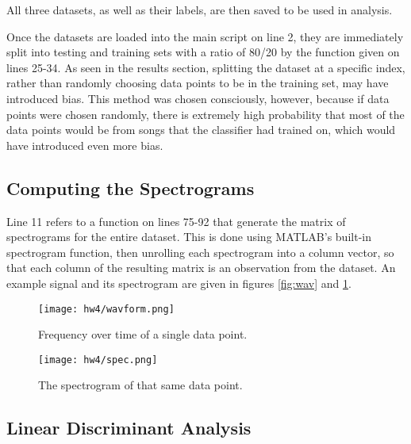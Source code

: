 \documentclass[a4paper,10 pt]{article}
\begin{document}
All three datasets, as well as their labels, are then saved to be used in analysis.

Once the datasets are loaded into the main script on line 2, they are immediately split into testing and training sets with a ratio of 80/20 by the function given on lines 25-34. As seen in the results section, splitting the dataset at a specific index, rather than randomly choosing data points to be in the training set, may have introduced bias. This method was chosen consciously, however, because if data points were chosen randomly, there is extremely high probability that most of the data points would be from songs that the classifier had trained on, which would have introduced even more bias.


\subsection{Computing the Spectrograms}

Line 11 refers to a function on lines 75-92 that generate the matrix of spectrograms for the entire dataset. This is done using MATLAB's built-in spectrogram function, then unrolling each spectrogram into a column vector, so that each column of the resulting matrix is an observation from the dataset. An example signal and its spectrogram are given in figures \ref{fig:wav} and \ref{fig:spec}.

\begin{figure}
    \centering
    \begin{minipage}{0.45\textwidth}
        \centering
        \texttt{[image: hw4/wavform.png]} %
        \caption{Frequency over time of a single data point.}
        \label{fig:wav}
    \end{minipage}\hfill
    \begin{minipage}{0.45\textwidth}
        \centering
        \texttt{[image: hw4/spec.png]} %
        \caption{The spectrogram of that same data point.}
        \label{fig:spec}
    \end{minipage}
\end{figure}

\subsection{Linear Discriminant Analysis}
\end{document}
